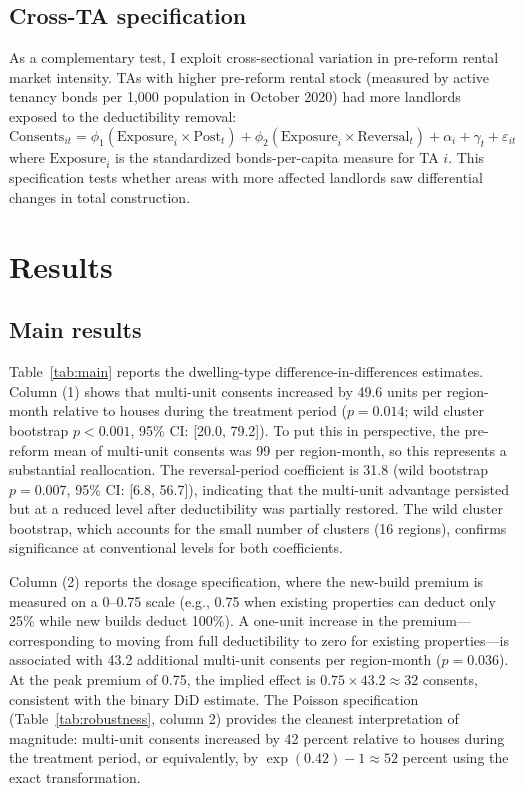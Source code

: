 \documentclass[12pt]{article}
\begin{document}
\subsection{Cross-TA specification}

As a complementary test, I exploit cross-sectional variation in pre-reform rental market intensity. TAs with higher pre-reform rental stock (measured by active tenancy bonds per 1,000 population in October 2020) had more landlords exposed to the deductibility removal:
\begin{equation}
\text{Consents}_{it} = \phi_1 (\text{Exposure}_i \times \text{Post}_t) + \phi_2 (\text{Exposure}_i \times \text{Reversal}_t) + \alpha_i + \gamma_t + \varepsilon_{it}
\label{eq:ta}
\end{equation}
where $\text{Exposure}_i$ is the standardized bonds-per-capita measure for TA $i$. This specification tests whether areas with more affected landlords saw differential changes in total construction.


\section{Results}
\label{sec:results}

\subsection{Main results}



Table~\ref{tab:main} reports the dwelling-type difference-in-differences estimates. Column (1) shows that multi-unit consents increased by 49.6 units per region-month relative to houses during the treatment period ($p = 0.014$; wild cluster bootstrap $p < 0.001$, 95\% CI: [20.0, 79.2]). To put this in perspective, the pre-reform mean of multi-unit consents was 99 per region-month, so this represents a substantial reallocation. The reversal-period coefficient is 31.8 (wild bootstrap $p = 0.007$, 95\% CI: [6.8, 56.7]), indicating that the multi-unit advantage persisted but at a reduced level after deductibility was partially restored. The wild cluster bootstrap, which accounts for the small number of clusters (16 regions), confirms significance at conventional levels for both coefficients.

Column (2) reports the dosage specification, where the new-build premium is measured on a 0--0.75 scale (e.g., 0.75 when existing properties can deduct only 25\% while new builds deduct 100\%). A one-unit increase in the premium---corresponding to moving from full deductibility to zero for existing properties---is associated with 43.2 additional multi-unit consents per region-month ($p = 0.036$). At the peak premium of 0.75, the implied effect is $0.75 \times 43.2 \approx 32$ consents, consistent with the binary DiD estimate. The Poisson specification (Table~\ref{tab:robustness}, column 2) provides the cleanest interpretation of magnitude: multi-unit consents increased by 42 percent relative to houses during the treatment period, or equivalently, by $\exp(0.42) - 1 \approx 52$ percent using the exact transformation.
\end{document}
